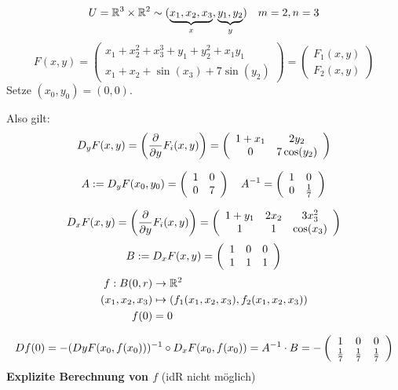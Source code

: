\documentclass[main.tex]{subfiles}
\begin{document}
\begin{Beispiel}
  $$U = \mathbb{R}^3 \times \mathbb{R}^2 \sim (\underbrace{x_1,x_2,x_3}_{x},\underbrace{y_1,y_2}_{y})\quad m = 2, n = 3$$
  $$F(x,y) = \left(\begin{array}{c}
    x_1 + x_2^2 + x_3^3 + y_1 + y_2^2 + x_1 y_1 \\
    x_1 + x_2 + \sin(x_3) + 7 \sin(y_2)
  \end{array}\right)
  = \left(\begin{array}{c}
    F_1(x,y) \\
    F_2(x,y)
  \end{array}\right)$$
  Setze $(x_0,y_0) = (0,0)$.

  Also gilt:
  $$D_y F (x,y) = \left(\dfrac{\partial}{\partial y} F_i (x,y)\right)
  = \left(\begin{array}{c c}
    1 + x_1 & 2y_2\\
    0 & 7 \cos(y_2)
  \end{array}\right)$$

  $$A := D_y F(x_0,y_0) = \left(\begin{array}{c c}
    1 & 0 \\
    0 & 7
  \end{array}\right) \quad
  A^{-1} = \left(\begin{array}{c c}
    1 & 0 \\
    0 & \frac{1}{7}
  \end{array}\right)$$

  $$D_x F (x,y) = \left(\dfrac{\partial}{\partial y} F_i (x,y)\right)
  = \left(\begin{array}{c c c}
    1 + y_1 & 2x_2 & 3 x_3^2 \\
    1 & 1 & \cos(x_3)
  \end{array}\right)$$
  $$B := D_x F(x,y) = \left(\begin{array}{c c c}
    1& 0 & 0 \\
    1 & 1 & 1
  \end{array}\right)$$
  $$\begin{aligned}
    f: B(0,r) & \to \mathbb{R}^2 \\
    (x_1,x_2,x_3) & \mapsto (f_1(x_1,x_2,x_3),f_2(x_1,x_2,x_3)) \\
    f(0) & = 0
  \end{aligned}$$

  $$Df(0) = -(DyF(x_0,f(x_0)))^{-1} \circ D_x F(x_0,f(x_0)) = A^{-1} \cdot B = - \left(\begin{array}{c c c}
    1 & 0 & 0 \\
    \frac{1}{7} & \frac{1}{7} & \frac{1}{7}
  \end{array}\right)$$
  \textbf{Explizite Berechnung von $f$} (idR nicht möglich)


\end{Beispiel}
\end{document}
